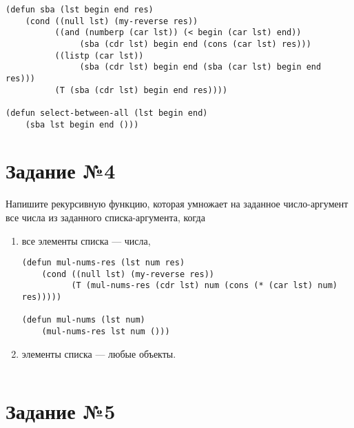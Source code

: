 \vspace{4mm}
\begin{minipage}{0.92\linewidth}
\begin{lstlisting}
(defun sba (lst begin end res)
    (cond ((null lst) (my-reverse res))
          ((and (numberp (car lst)) (< begin (car lst) end))
               (sba (cdr lst) begin end (cons (car lst) res)))
          ((listp (car lst)) 
               (sba (cdr lst) begin end (sba (car lst) begin end res)))
          (T (sba (cdr lst) begin end res))))

(defun select-between-all (lst begin end)
    (sba lst begin end ()))
\end{lstlisting}
\end{minipage}

\section{Задание №4}

Напишите рекурсивную функцию, которая умножает на заданное
число-аргумент все числа из заданного списка-аргумента, когда 

\begin{enumerate}
    \item все элементы списка --- числа,

\vspace{4mm}
\begin{minipage}{0.92\linewidth}
\begin{lstlisting}
(defun mul-nums-res (lst num res)
    (cond ((null lst) (my-reverse res))
          (T (mul-nums-res (cdr lst) num (cons (* (car lst) num) res)))))

(defun mul-nums (lst num)
    (mul-nums-res lst num ()))
\end{lstlisting}
\end{minipage}

    \item элементы списка --- любые объекты.

\vspace{4mm}
\begin{minipage}{0.92\linewidth}
\begin{lstlisting}
\end{lstlisting}
\end{minipage}

\end{enumerate}

\section{Задание №5}

